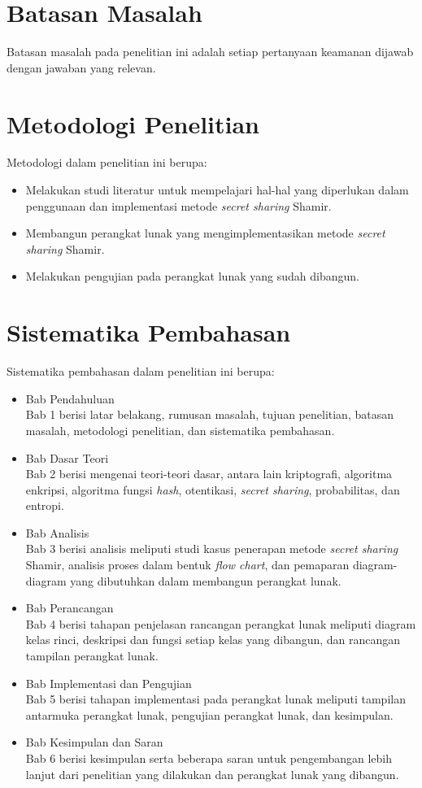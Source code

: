 \section{Batasan Masalah}
\label{sec:batasanmasalah}

Batasan masalah pada penelitian ini adalah setiap pertanyaan keamanan dijawab dengan jawaban yang relevan.

\section{Metodologi Penelitian}
\label{sec:metodologi penelitian}

Metodologi dalam penelitian ini berupa:
\begin{itemize}
	\item Melakukan studi literatur untuk mempelajari hal-hal yang diperlukan dalam penggunaan dan implementasi metode \textit{secret sharing} Shamir.
	\item Membangun perangkat lunak yang mengimplementasikan metode \textit{secret sharing} Shamir.
	\item Melakukan pengujian pada perangkat lunak yang sudah dibangun.
\end{itemize}

\section{Sistematika Pembahasan}
\label{sec:sistematikapembahasan}

Sistematika pembahasan dalam penelitian ini berupa:
\begin{itemize}
	\item Bab Pendahuluan
	\\Bab 1 berisi latar belakang, rumusan masalah, tujuan penelitian, batasan masalah, metodologi penelitian, dan sistematika pembahasan.
	\item Bab Dasar Teori
	\\Bab 2 berisi mengenai teori-teori dasar, antara lain kriptografi, algoritma enkripsi, algoritma fungsi \textit{hash}, otentikasi, \textit{secret sharing}, probabilitas, dan entropi.
	\item Bab Analisis
	\\Bab 3 berisi analisis meliputi studi kasus penerapan metode \textit{secret sharing} Shamir, analisis proses dalam bentuk \textit{flow chart}, dan pemaparan diagram-diagram yang dibutuhkan dalam membangun perangkat lunak.
	\item Bab Perancangan
	\\Bab 4 berisi tahapan penjelasan rancangan perangkat lunak meliputi diagram kelas rinci, deskripsi dan fungsi setiap kelas yang dibangun, dan rancangan tampilan perangkat lunak.
	\item Bab Implementasi dan Pengujian
	\\Bab 5 berisi tahapan implementasi pada perangkat lunak meliputi tampilan antarmuka perangkat lunak, pengujian perangkat lunak, dan kesimpulan.
	\item Bab Kesimpulan dan Saran
	\\Bab 6 berisi kesimpulan serta beberapa saran untuk pengembangan lebih lanjut dari penelitian yang dilakukan dan perangkat lunak yang dibangun.
\end{itemize}